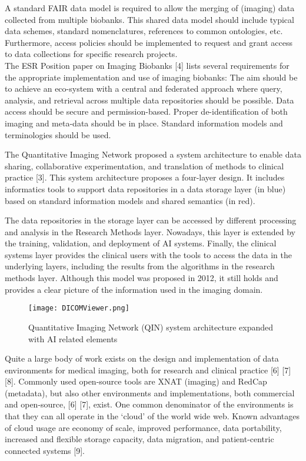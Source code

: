 A standard FAIR data model is required to allow the merging of (imaging) data collected from multiple biobanks. This shared data model should include typical data schemes, standard nomenclatures, references to common ontologies, etc. Furthermore, access policies should be implemented to request and grant access to data collections for specific research projects.\\
The ESR Position paper on Imaging Biobanks [4] lists several requirements for the appropriate implementation and use of imaging biobanks:
The aim should be to achieve an eco-system with a central and federated approach where query, analysis, and retrieval across multiple data repositories should be possible.
Data access should be secure and permission-based.
Proper de-identification of both imaging and meta-data should be in place.
Standard information models and terminologies should be used.


The Quantitative Imaging Network proposed a system architecture to enable data sharing, collaborative experimentation, and translation of methods to clinical practice [3].  This system architecture proposes a four-layer design. It includes informatics tools to support data repositories in a data storage layer (in blue) based on standard information models and shared semantics (in red). 


The data repositories in the storage layer can be accessed by different processing and analysis in the Research Methods layer. Nowadays, this layer is extended by the training, validation, and deployment of AI systems. Finally, the clinical systems layer provides the clinical users with the tools to access the data in the underlying layers, including the results from the algorithms in the research methods layer.
Although this model was proposed in 2012, it still holds and provides a clear picture of the information used in the imaging domain.
\begin{figure}[h!]
 \centering
  \texttt{[image: DICOMViewer.png]}
    \caption{Quantitative Imaging Network (QIN) system architecture expanded with AI related elements}

  \label{fig:CDS}
\end{figure}


Quite a large body of work exists on the design and implementation of data environments for medical imaging, both for research and clinical practice [6] [7] [8]. Commonly used open-source tools are XNAT (imaging) and RedCap (metadata), but also other environments and implementations, both commercial and open-source, [6] [7], exist. One common denominator of the environments is that they can all operate in the ‘cloud’ of the world wide web. Known advantages of cloud usage are economy of scale, improved performance, data portability, increased and flexible storage capacity, data migration, and patient-centric connected systems [9].

